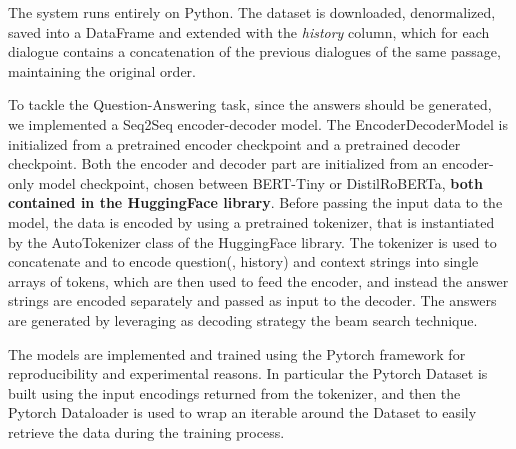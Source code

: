 \documentclass[11pt]{article}
\begin{document}

The system runs entirely on Python. The dataset is downloaded, denormalized, saved into a DataFrame and extended with the \textit{history} column, which for each dialogue contains a concatenation of the previous dialogues of the same passage, maintaining the original order.

To tackle the Question-Answering task, since the answers should be generated, we implemented a Seq2Seq encoder-decoder model. The EncoderDecoderModel is initialized from a pretrained encoder checkpoint and a pretrained decoder checkpoint. Both the encoder and decoder part are initialized from an encoder-only model checkpoint, chosen between BERT-Tiny or DistilRoBERTa, \textbf{both contained in the HuggingFace library}. Before passing the input data to the model, the data is encoded by using a pretrained tokenizer, that is instantiated by the AutoTokenizer class of the HuggingFace library. The tokenizer is used to concatenate and to encode question(, history) and context strings into single arrays of tokens, which are then used to feed the encoder, and instead the answer strings are encoded separately and passed as input to the decoder. The answers are generated by leveraging as decoding strategy the beam search technique.

The models are implemented and trained using the Pytorch framework for reproducibility and experimental reasons. In particular the Pytorch Dataset is built using the input encodings returned from the tokenizer, and then the Pytorch Dataloader is used to wrap an iterable around the Dataset to easily retrieve the data during the training process.
\end{document}
